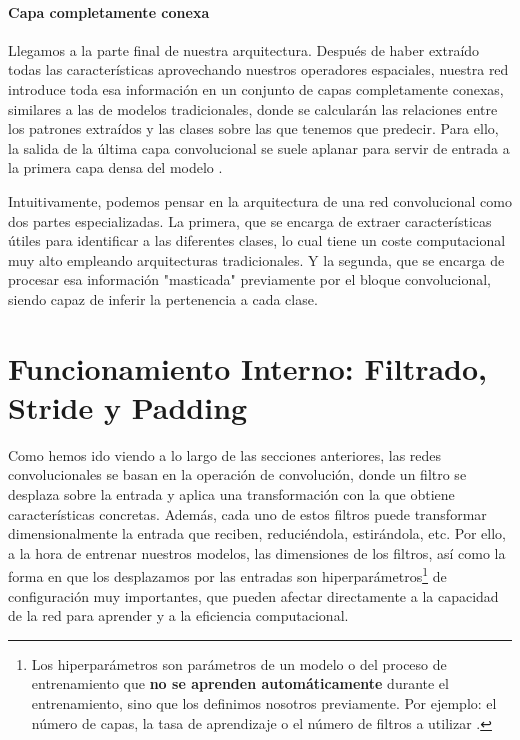 \paragraph{Capa completamente conexa}

Llegamos a la parte final de nuestra arquitectura. Después de haber extraído todas las características aprovechando nuestros operadores espaciales, nuestra red introduce toda esa información en un conjunto de capas completamente conexas, similares a las de modelos tradicionales, donde se calcularán las relaciones entre los patrones extraídos y las clases sobre las que tenemos que predecir. Para ello, la salida de la última capa convolucional se suele aplanar para servir de entrada a la primera capa densa del modelo \cite{nn_dl__michael_nielsen_2015}.

Intuitivamente, podemos pensar en la arquitectura de una red convolucional como dos partes especializadas. La primera, que se encarga de extraer características útiles para identificar a las diferentes clases, lo cual tiene un coste computacional muy alto empleando arquitecturas tradicionales. Y la segunda, que se encarga de procesar esa información "masticada" previamente por el bloque convolucional, siendo capaz de inferir la pertenencia a cada clase.



\section{Funcionamiento Interno: Filtrado, Stride y Padding}\label{sec:funcionamiento_interno_cnn}

Como hemos ido viendo a lo largo de las secciones anteriores, las redes convolucionales se basan en la operación de convolución, donde un filtro se desplaza sobre la entrada y aplica una transformación con la que obtiene características concretas. Además, cada uno de estos filtros puede transformar dimensionalmente la entrada que reciben, reduciéndola, estirándola, etc. Por ello, a la hora de entrenar nuestros modelos, las dimensiones de los filtros, así como la forma en que los desplazamos por las entradas son hiperparámetros\footnote{Los hiperparámetros son parámetros de un modelo o del proceso de entrenamiento que \textbf{no se aprenden automáticamente} durante el entrenamiento, sino que los definimos nosotros previamente. Por ejemplo: el número de capas, la tasa de aprendizaje o el número de filtros a utilizar \cite{dl__goodfellow_2016}.} de configuración muy importantes, que pueden afectar directamente a la capacidad de la red para aprender y a la eficiencia computacional.

